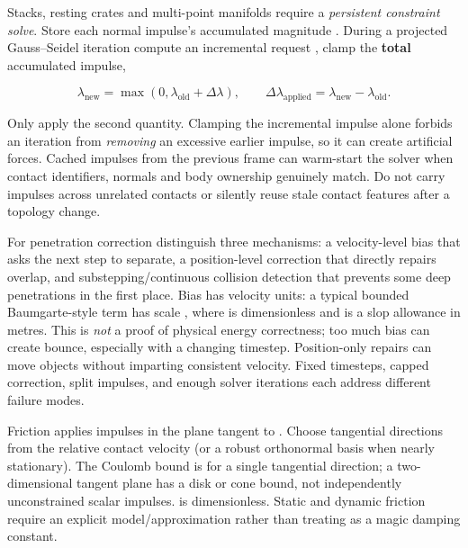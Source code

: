 Stacks, resting crates and multi-point manifolds require a \emph{persistent constraint solve}. Store each normal impulse's accumulated magnitude . During a projected Gauss--Seidel iteration compute an incremental request , clamp the \textbf{total} accumulated impulse,

\[
\lambda_{\mathrm{new}}=\max(0,\lambda_{\mathrm{old}}+\Delta\lambda),\qquad
\Delta\lambda_{\mathrm{applied}}=\lambda_{\mathrm{new}}-\lambda_{\mathrm{old}}.
\]

Only apply the second quantity. Clamping the incremental impulse alone forbids an iteration from \emph{removing} an excessive earlier impulse, so it can create artificial forces. Cached impulses from the previous frame can warm-start the solver when contact identifiers, normals and body ownership genuinely match. Do not carry impulses across unrelated contacts or silently reuse stale contact features after a topology change.

For penetration correction distinguish three mechanisms: a velocity-level bias that asks the next step to separate, a position-level correction that directly repairs overlap, and substepping/continuous collision detection that prevents some deep penetrations in the first place. Bias has velocity units: a typical bounded Baumgarte-style term has scale , where  is dimensionless and  is a slop allowance in metres. This is \emph{not} a proof of physical energy correctness; too much bias can create bounce, especially with a changing timestep. Position-only repairs can move objects without imparting consistent velocity. Fixed timesteps, capped correction, split impulses, and enough solver iterations each address different failure modes.

Friction applies impulses in the plane tangent to . Choose tangential directions from the relative contact velocity (or a robust orthonormal basis when nearly stationary). The Coulomb bound is  for a single tangential direction; a two-dimensional tangent plane has a disk or cone bound, not independently unconstrained scalar impulses.  is dimensionless. Static and dynamic friction require an explicit model/approximation rather than treating  as a magic damping constant.

